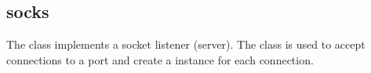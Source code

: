 %
%
%
%
%              

\subsection{socks}
\label{socks}

The  class implements a socket listener (server).  The
 class is used to accept connections to a port and create a
 instance for each connection.

